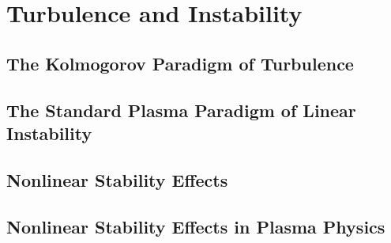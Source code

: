 \chapter{Turbulence and Instability}
\label{c_turb_and_inst}

\section{The Kolmogorov Paradigm of Turbulence}
\label{s_kolmogorov}

\section{The Standard Plasma Paradigm of Linear Instability}
\label{s_lin_inst_paradigm}

\section{Nonlinear Stability Effects}
\label{s_nlin_stability}

\section{Nonlinear Stability Effects in Plasma Physics}
\label{s_nlin_stab_pp}
